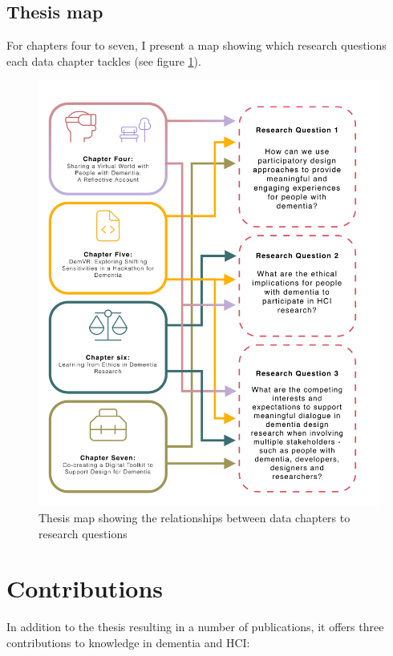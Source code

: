 \newpage
\subsection{Thesis map}
For chapters four to seven, I present a map showing which research questions each data chapter tackles (see figure \ref{fig:RQ_and_Chapters}).

\label{Intro:Thesis Map}
\begin{figure}[htp]
\centering
\includegraphics[width=.8\linewidth]{Images/Thesis_Narrative/RQ_and_Chapters.png}
\caption{Thesis map showing the relationships between data chapters to research questions}
\label{fig:RQ_and_Chapters}
\end{figure}


\section{Contributions}
\label{Intro:Contribution}
In addition to the thesis resulting in a number of publications, it offers three contributions to knowledge in dementia and HCI:

